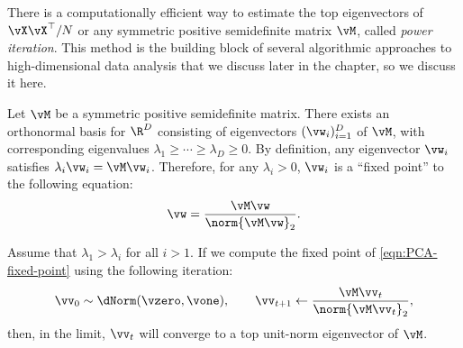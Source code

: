 \documentclass[../../book-main.tex]{subfiles}
\begin{document}
There is a computationally efficient way to estimate the top
eigenvectors of \(\vX\vX^{\top}/N\) or any symmetric positive
semidefinite matrix \(\vM\), called \textit{power iteration}. This
method is the building block of several algorithmic approaches to
high-dimensional data analysis that we discuss later in the chapter,
so we discuss it here.

Let \(\vM\) be a symmetric positive semidefinite matrix. There exists
an orthonormal basis for \(\R^{D}\) consisting of eigenvectors
\((\vw_{i})_{i = 1}^{D}\) of \(\vM\), with corresponding eigenvalues
\(\lambda_{1} \geq \cdots \geq \lambda_{D} \geq 0\). By definition,
any eigenvector $\vw_i$ satisfies $\lambda_i \vw_i = \vM \vw_i$.
Therefore, for any $\lambda_i > 0$, $\vw_i$ is a   ``fixed point'' to
the following equation:
\begin{equation}
    \vw = \frac{\vM\vw}{\norm{\vM\vw}_{2}}.
    \label{eqn:PCA-fixed-point}
\end{equation}

\begin{theorem}
    Assume that \(\lambda_{1} > \lambda_{i}\) for all \(i > 1\). If
    we compute the fixed point of  \eqref{eqn:PCA-fixed-point} using
    the following iteration:
    \begin{equation}\label{eq:power_iteration}
        \vv_{0} \sim \dNorm(\vzero, \vone), \qquad \vv_{t + 1} \gets
        \frac{\vM\vv_{t}}{\norm{\vM\vv_{t}}_{2}},
    \end{equation}
    then, in the limit, \(\vv_{t}\) will converge to a top unit-norm
    eigenvector of \(\vM\).
\end{theorem}
\end{document}
